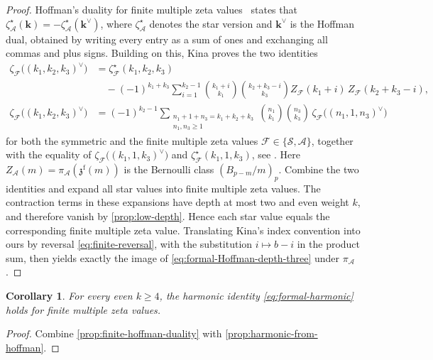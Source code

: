 \documentclass[12pt]{amsart}
\numberwithin{equation}{section}
\theoremstyle{plain}
\newtheorem{cor}[cor]{Corollary}
\newcommand{\zzf}[1]{\mathfrak z^{\mathrm f}(#1)}
\begin{document}
\begin{proof}
Hoffman's duality for finite multiple zeta
values~\cite{HoffmanFinite} states that
$\zeta^\star_{\mathcal A}(\boldsymbol k)
=-\zeta^\star_{\mathcal A}(\boldsymbol k^\vee)$, where
$\zeta^\star_{\mathcal A}$ denotes the star version and
$\boldsymbol k^\vee$ is the Hoffman dual, obtained by writing every
entry as a sum of ones and exchanging all commas and plus signs.
Building on this, Kina proves the two identities
\begin{align*}
 \zeta_{\mathcal F}\bigl((k_1,k_2,k_3)^\vee\bigr)
 &=\zeta^\star_{\mathcal F}(k_1,k_2,k_3)\\
 &\quad-(-1)^{k_1+k_3}\sum_{i=1}^{k_2-1}
 \binom{k_1+i}{k_1}\binom{k_2+k_3-i}{k_3}
 Z_{\mathcal F}(k_1+i)\,Z_{\mathcal F}(k_2+k_3-i),\\
 \zeta_{\mathcal F}\bigl((k_1,k_2,k_3)^\vee\bigr)
 &=(-1)^{k_2-1}
 \sum_{\substack{n_1+1+n_3=k_1+k_2+k_3\\n_1,n_3\geq1}}
 \binom{n_1}{k_1}\binom{n_3}{k_3}\,
 \zeta_{\mathcal F}\bigl((n_1,1,n_3)^\vee\bigr)
\end{align*}
for both the symmetric and the finite multiple zeta values
$\mathcal F\in\{\mathcal S,\mathcal A\}$, together with the
equality of $\zeta_{\mathcal F}\bigl((k_1,1,k_3)^\vee\bigr)$ and
$\zeta^\star_{\mathcal F}(k_1,1,k_3)$, see
\cite[Lemma~4.1, equation~(5.2) and Section~5]{Kina}. Here
$Z_{\mathcal A}(m)=\pi_{\mathcal A}(\zzf m)$ is the Bernoulli class
$(B_{p-m}/m)_p$.
Combine the two identities and expand all star values into finite
multiple zeta values. The contraction terms in these expansions have
depth at most two and even weight $k$, and therefore vanish by
\cref{prop:low-depth}. Hence each star value equals the
corresponding finite multiple zeta value. Translating Kina's index
convention into ours by reversal \eqref{eq:finite-reversal}, with the
substitution $i\mapsto b-i$ in the product sum, then yields exactly
the image of \eqref{eq:formal-Hoffman-depth-three} under
$\pi_{\mathcal A}$.
\end{proof}

\begin{cor}\label{cor:finite-harmonic}
For every even $k\geq4$, the harmonic identity \eqref{eq:formal-harmonic}
holds for finite multiple zeta values.
\end{cor}

\begin{proof}
Combine \cref{prop:finite-hoffman-duality} with
\cref{prop:harmonic-from-hoffman}.
\end{proof}
\end{document}
